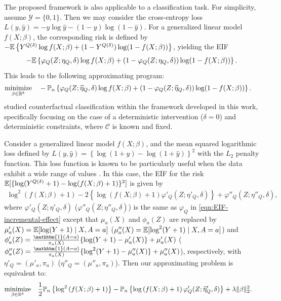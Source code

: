 \begin{example2}
The proposed framework is also applicable to a classification task. For simplicity, assume $\mathcal{Y} = \{0,1\}$. Then we may consider the cross-entropy loss $L(y,\widehat{y})=- y\log \widehat{y} - (1-y) \log (1-\widehat{y})$. For a generalized linear model $f(X;\beta)$, the corresponding risk is defined by $-\mathbb{E}\left\{ Y^{Q(\delta)}\log f(X;\beta) + (1-Y^{Q(\delta)})\log(1-f(X;\beta)) \right\}$, yielding the EIF
\begin{align*}
        -\mathbb{E}\left\{ \varphi_Q(Z;\eta_Q,\delta) \log f(X;\beta) + (1-\varphi_Q(Z;\eta_Q,\delta))\log(1-f(X;\beta)) \right\}.
\end{align*}
This leads to the following approximating program:
\begin{align*}
    & \underset{\beta \in \mathbb{R}^k}{\text{minimize}} \quad -\mathbb{P}_n\left\{ \varphi_Q(Z;\widehat{\eta}_Q,\delta) \log f(X;\beta) + (1-\varphi_Q(Z;\widehat{\eta}_Q,\delta))\log(1-f(X;\beta)) \right\}.
\end{align*}
\citet{kim2022doubly} studied counterfactual classification within the framework developed in this work, specifically focusing on the case of a deterministic intervention ($\delta = 0$) and deterministic constraints, where $\mathcal{C}$ is known and fixed. 
\end{example2}

\begin{example2} \label{example:mean-squared-logarithmic-loss}
Consider a generalized linear model $f(X;\beta)$, and the mean squared logarithmic loss defined by $L(y,\widehat{y})=\left\{\log(1+y) - \log(1+\widehat{y})\right\}^2$ with the $L_2$ penalty function. This loss function is known to be particularly useful when the data exhibit a wide range of values \citep{hodson2021mean}. In this case, the EIF for the risk $\mathbb{E}[\{\log(Y^{Q(\delta)}+1) - \log(f(X;\beta) + 1)\}^2]$ is given by
\begin{align*}
        \log^2\left( f(X;\beta)+1 \right) - 2\left\{\log\left( f(X;\beta)+1 \right)\varphi'_Q(Z;\eta'_Q,\delta)\right\} + \varphi''_Q(Z;\eta''_Q,\delta),
\end{align*}
where $\varphi'_Q(Z;\eta'_Q,\delta)$ ($\varphi''_Q(Z;\eta''_Q,\delta)$) is the same as $\varphi_Q$ in \eqref{eqn:EIF-incremental-effect} except that $\mu_a(X)$ and $\phi_a(Z)$ are replaced by $\mu'_a(X) = \mathbb{E}[\log(Y+1) \mid X,A=a]$ ($\mu''_a(X) = \mathbb{E}[\log^2(Y+1) \mid X,A=a]$) and
$
\phi'_a(Z) = \frac{\mathbbm{1}(A = a)}{\pi_a(X)} \{ \log(Y+1) - \mu'_a(X) \} + \mu'_a(X)
$ ($\phi''_a(Z) = \frac{\mathbbm{1}(A = a)}{\pi_a(X)} \{ \log^2(Y+1) - \mu''_a(X) \} + \mu''_a(X)$), respectively, with $\eta'_Q=(\mu'_a,\pi_a)$ ($\eta''_Q=(\mu''_a,\pi_a)$).
Then our approximating problem is equivalent to:
\begin{align*}
    & \underset{\beta \in \mathbb{R}^k}{\text{minimize}} \quad \frac{1}{2} \mathbb{P}_n\left\{\log^2\left( f(X;\beta)+1 \right) \right\} - \mathbb{P}_n\left\{\log\left( f(X;\beta)+1 \right)\varphi'_Q(Z;\widehat{\eta}'_Q,\delta)\right\} + \lambda\Vert \beta \Vert_2^2.
\end{align*}
\end{example2}

